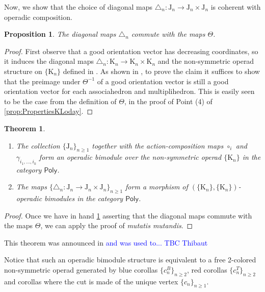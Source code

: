 \documentclass[twoside, 12pt]{amsart}
\newtheorem{proposition}[definition]{Proposition}
\newtheorem{theorem}{Theorem}
\theoremstyle{remark}
\newcommand{\K}{\mathrm{K}}
\newcommand{\J}{\mathrm{J}}
\newcommand{\PolySub}{\mathsf{Poly}}
\newcommand{\Guillaume}[1]{\textcolor{blue}{#1}}
\begin{document}
Now, we show that the choice of diagonal maps $\triangle_n : \J_n \to \J_n \times \J_n$ is coherent with operadic composition. 

\begin{proposition} 
\label{prop:thetacommutes}
The diagonal maps $\triangle_n$ commute with the maps $\Theta$.  
\end{proposition}

\begin{proof}
First observe that a good orientation vector has decreasing coordinates, so it induces the diagonal maps $\triangle_n : \K_n \to \K_n \times \K_n$ and the non-symmetric operad structure on $\{\K_n\}$ defined in \cite{MTTV19}. 
As shown in \cite[Proposition 4.14]{LA21}, to prove the claim it suffices to show that the preimage under $\Theta^{-1}$ of a good orientation vector is still a good orientation vector for each associahedron and multiplihedron. 
This is easily seen to be the case from the definition of $\Theta$, in the proof of Point (4) of \cref{prop:PropertiesKLoday}. 
\end{proof}


\begin{theorem}\label{thm:MainOperad}\leavevmode
\begin{enumerate}
\item The collection $\{\J_n\}_{n\geq 1}$ together with the action-composition maps $\circ_i$ and $\gamma_{i_1,\ldots,i_k}$ form an operadic bimodule over the non-symmetric operad $\{\K_n\}$ in the category $\PolySub$. 

\item The maps $\{\triangle_n : \J_n \to \J_n\times \J_n\}_{n\geq 1}$ form a morphism of $(\{\K_n\},\{\K_n\})$-operadic bimodules in the category $\PolySub$. 
\end{enumerate}
\end{theorem}

\begin{proof}
Once we have in hand \cref{prop:thetacommutes} asserting that the diagonal maps commute with the maps $\Theta$, we can apply the proof of \cite[Theorem~1]{MTTV19} \emph{mutatis mutandis}.
\end{proof}

This theorem was announced in \cite{Mazuir21} \Guillaume{and was used to... TBC Thibaut} 

Notice that such an operadic bimodule structure is equivalent to a free 2-colored non-symmetric operad generated by blue corollas $\{c_n^B\}_{n\geq 2}$, red corollas $\{c_n^T\}_{n\geq 2}$ and corollas where the cut is made of the unique vertex $\{c_n\}_{n \geq 1}$.
\end{document}
